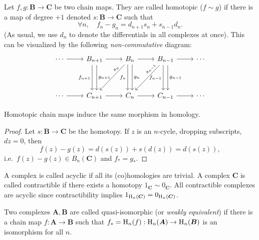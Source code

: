 \begin{defn}
    Let $f,g:\bm{B}\to \bm{C}$ be two chain maps. They are called homotopic ($f\sim g$) if there is a map of degree $+1$ denoted $s:\bm{B}\to \bm{C}$ such that 
    \[\forall n,\quad f_n-g_n=d_{n+1}s_n+s_{n-1}d_n.\]
    (As usual, we use $d_n$ to denote the differentials in all complexes at once).
    This can be visualized by the following \emph{non-commutative} diagram:
     \[\begin{tikzcd}
        \cdots\ar[r] & B_{n+1}\ar[r]\ar[dd,swap, xshift=-.75ex,"f_{n+1}"]\ar[dd,xshift=.75ex,"g_{n+1}"] & B_{n} \arrow[r]\ar[dd,swap,xshift=-.75ex,"f_n"]\ar[dd,xshift=.75ex,"g_n"]\ar[ddl,sloped, near start,"s_n"] & B_{n-1}\ar[dd,swap,xshift=-.75ex,"f_{n-1}"]\ar[dd,xshift=.75ex,"g_{n-1}"]\ar[r]\ar[ddl, near start,sloped,"s_{n-1}"] & \cdots \\
        &&&&\\
       \cdots\ar[r] & C_{n+1}\ar[r] & C_n\ar[r] &C_{n-1} \ar[r] &\cdots
    \end{tikzcd}\]
\end{defn}

\begin{thm}
    Homotopic chain maps induce the same morphism in homology.
\end{thm}
\begin{proof}
     Let $s:\bm{B}\to\bm{C}$ be the homotopy. If $z$ is an $n$-cycle, dropping subscripts, $d z=0$, then
     \[f(z)-g(z)=d(s(z))+s(d(z))=d(s(z)),\]
     i.e.\ $f(z)-g(z)\in B_n(\bm{C})$ and $f_\ast=g_\ast$.
\end{proof}

\begin{defn}
    A complex is called acyclic if all its (co)homologies are trivial. A complex $\bm{C}$ is called contractible if there exists a homotopy $1_{\bm{C}}\sim 0_{\bm{C}}$. 
    All contractible complexes are acyclic since contractibility implies $1_{\mathrm{H}_n(\boldsymbol{C})}=0_{\mathrm{H}_n(\boldsymbol{C})}$.
\end{defn}

\begin{defn}
    Two complexes $\bm{A},\bm{B}$ are called quasi-isomorphic (or \emph{weakly equivalent}) if there is a chain map $f:\bm{A}\to \bm{B}$ such that $f_\ast=\mathrm{H}_n(f):\mathrm{H}_n(\boldsymbol{A})\to \mathrm{H}_n(\boldsymbol{B})$ is an isomorphism for all $n$.
\end{defn}

